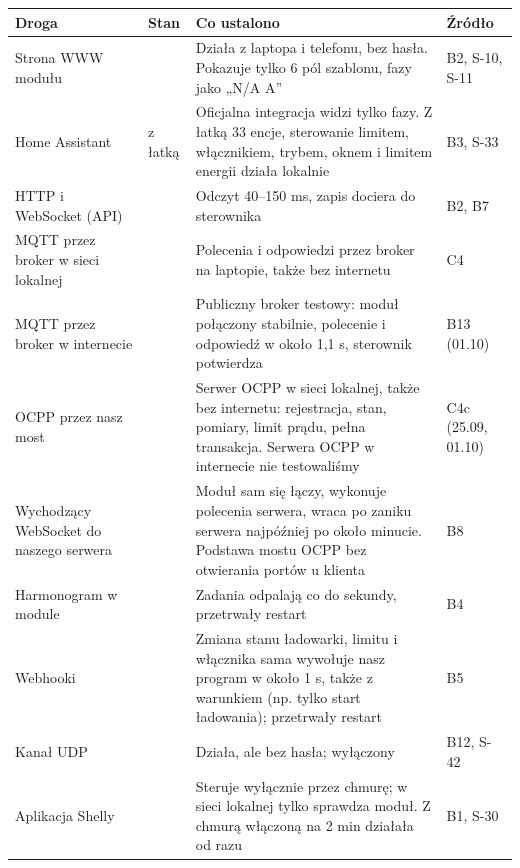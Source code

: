 \documentclass[11pt,a4paper]{article}
\begin{document}
\begin{longtable}{>{\raggedright\arraybackslash}p{3.00cm}>{\raggedright\arraybackslash}p{1.12cm}>{\raggedright\arraybackslash}p{9.24cm}>{\raggedright\arraybackslash}p{1.47cm}}
\toprule
\rowcolor{apteallight}\textbf{Droga} & \textbf{Stan} & \textbf{Co ustalono} & \textbf{Źródło} \\
\midrule\endhead
\bottomrule\endfoot
Strona WWW modułu & \leavevmode{\symbolfont\color{apgreen}\textbf{✔}} & Działa z laptopa i telefonu, bez hasła. Pokazuje tylko 6 pól szablonu, fazy jako „N/A A” & B2, S-10, S-11 \\
Home Assistant & \leavevmode{\symbolfont\color{apgreen}\textbf{✔}} z łatką & Oficjalna integracja widzi tylko fazy. Z łatką 33 encje, sterowanie limitem, włącznikiem, trybem, oknem i limitem energii działa lokalnie & B3, S-33 \\
HTTP i WebSocket (API) & \leavevmode{\symbolfont\color{apgreen}\textbf{✔}} & Odczyt 40–150 ms, zapis dociera do sterownika & B2, B7 \\
MQTT przez broker w sieci lokalnej & \leavevmode{\symbolfont\color{apgreen}\textbf{✔}} & Polecenia i odpowiedzi przez broker na laptopie, także bez internetu & C4 \\
MQTT przez broker w internecie & \leavevmode{\symbolfont\color{apgreen}\textbf{✔}} & Publiczny broker testowy: moduł połączony stabilnie, polecenie i odpowiedź w około 1,1 s, sterownik potwierdza & B13 (01.10) \\
OCPP przez nasz most & \leavevmode{\symbolfont\color{apgreen}\textbf{✔}} & Serwer OCPP w sieci lokalnej, także bez internetu: rejestracja, stan, pomiary, limit prądu, pełna transakcja. Serwera OCPP w internecie nie testowaliśmy & C4c (25.09, 01.10) \\
Wychodzący WebSocket do naszego serwera & \leavevmode{\symbolfont\color{apgreen}\textbf{✔}} & Moduł sam się łączy, wykonuje polecenia serwera, wraca po zaniku serwera najpóźniej po około minucie. Podstawa mostu OCPP bez otwierania portów u klienta & B8 \\
Harmonogram w module & \leavevmode{\symbolfont\color{apgreen}\textbf{✔}} & Zadania odpalają co do sekundy, przetrwały restart & B4 \\
Webhooki & \leavevmode{\symbolfont\color{apgreen}\textbf{✔}} & Zmiana stanu ładowarki, limitu i włącznika sama wywołuje nasz program w około 1 s, także z warunkiem (np. tylko start ładowania); przetrwały restart & B5 \\
Kanał UDP & \leavevmode{\symbolfont\color{apgreen}\textbf{✔}} & Działa, ale bez hasła; wyłączony & B12, S-42 \\
Aplikacja Shelly & \leavevmode{\symbolfont\color{apred}\textbf{✘}} & Steruje wyłącznie przez chmurę; w sieci lokalnej tylko sprawdza moduł. Z chmurą włączoną na 2 min działała od razu & B1, S-30 \\
\end{longtable}
\end{document}
